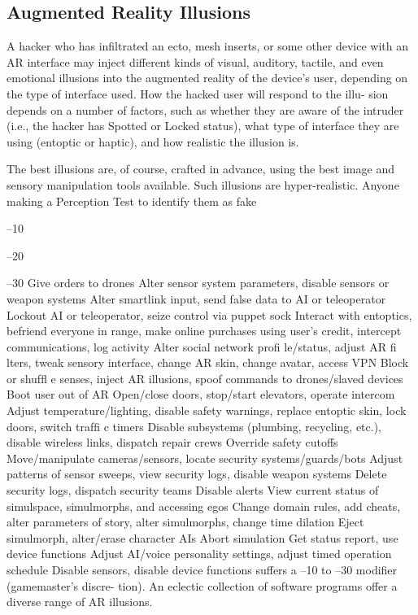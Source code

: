 \subsection{Augmented Reality Illusions}

A hacker who has infiltrated an ecto, mesh inserts, or 
some other device with an AR interface may inject 
different kinds of visual, auditory, tactile, and even 
emotional illusions into the augmented reality of 
the device's user, depending on the type of interface 
used. How the hacked user will respond to the illu-
sion depends on a number of factors, such as whether 
they are aware of the intruder (i.e., the hacker has 
Spotted or Locked status), what type of interface they 
are using (entoptic or haptic), and how realistic the 
illusion is.

The best illusions are, of course, crafted in advance, 
using the best image and sensory manipulation tools 
available. Such illusions are hyper-realistic. Anyone 
making a Perception Test to identify them as fake 

–10

–20

–30
Give orders to drones
Alter sensor system parameters, disable sensors or weapon systems
Alter smartlink input, send false data to AI or teleoperator
Lockout AI or teleoperator, seize control via puppet sock
Interact with entoptics, befriend everyone in range, make online 
purchases using user's credit, intercept communications, log activity
Alter social network proﬁ le/status, adjust AR ﬁ lters, tweak sensory 
interface, change AR skin, change avatar, access VPN
Block or shufﬂ e senses, inject AR illusions, spoof commands to 
drones/slaved devices
Boot user out of AR
 Open/close doors, stop/start elevators, operate intercom
Adjust temperature/lighting, disable safety warnings, 
replace entoptic skin, lock doors, switch trafﬁ c timers
Disable subsystems (plumbing, recycling, etc.), disable wireless links, 
dispatch repair crews
Override safety cutoffs
Move/manipulate cameras/sensors, locate security systems/guards/bots
Adjust patterns of sensor sweeps, view security logs, 
disable weapon systems
Delete security logs, dispatch security teams
Disable alerts
View current status of simulspace, simulmorphs, and accessing egos
Change domain rules, add cheats, alter parameters of story, 
alter simulmorphs, change time dilation
Eject simulmorph, alter/erase character AIs
Abort simulation
Get status report, use device functions
Adjust AI/voice personality settings, adjust timed operation schedule
Disable sensors, disable device functions
suffers a –10 to –30 modifier (gamemaster's discre-
tion). An eclectic collection of software programs 
offer a diverse range of AR illusions.

